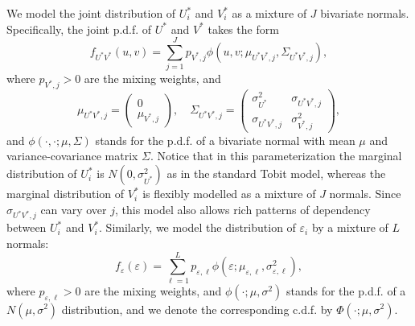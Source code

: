 \documentclass[12pt]{article}
\begin{document}
We model the joint distribution of $U_{i}^{\ast }$ and $V_{i}^{\ast }$ as a
mixture of $J$ bivariate normals. Specifically, the joint p.d.f. of $U^{\ast
}$ and $V^{\ast }$ takes the form %
\begin{equation*}
f_{U^{\ast }V^{\ast }}(u,v)=\sum_{j=1}^{J}p_{V^{\ast },j}\phi (u,v;\mu
_{U^{\ast }V^{\ast },j},\Sigma _{U^{\ast }V^{\ast },j}),
\end{equation*}%
where $p_{V^{\ast },j}>0$ are the mixing weights, and 
\begin{equation*}
\mu _{U^{\ast }V^{\ast },j}=%
\begin{pmatrix}
0 \\ 
\mu _{V^{\ast },j}%
\end{pmatrix}%
,\quad \Sigma _{U^{\ast }V^{\ast },j}=%
\begin{pmatrix}
\sigma _{U^{\ast }}^{2} & \sigma _{U^{\ast }V^{\ast },j} \\ 
\sigma _{U^{\ast }V^{\ast },j} & \sigma _{V^{\ast },j}^{2}%
\end{pmatrix}%
,
\end{equation*}%
and $\phi (\cdot ,\cdot ;\mu ,\Sigma )$ stands for the p.d.f. of a bivariate
normal with mean $\mu $ and variance-covariance matrix $\Sigma $. Notice
that in this parameterization the marginal distribution of $U_{i}^{\ast }$
is $N(0,\sigma _{U^{\ast }}^{2})$ as in the standard Tobit model, whereas
the marginal distribution of $V_{i}^{\ast }$ is flexibly modelled as a
mixture of $J$ normals. Since $\sigma _{U^{\ast }V^{\ast },j}$ can vary over 
$j$, this model also allows rich patterns of dependency between $U_{i}^{\ast
}$ and $V_{i}^{\ast }$. Similarly, we model the distribution of $\varepsilon
_{i}$ by a mixture of $L$ normals:%
\begin{equation*}
f_{\varepsilon }(\varepsilon )=\sum_{\ell =1}^{L}p_{\varepsilon ,\ell }\phi
(\varepsilon ;\mu _{\varepsilon ,\ell },\sigma _{\varepsilon ,\ell }^{2}),
\end{equation*}%
where $p_{\varepsilon ,\ell }>0$ are the mixing weights, and $\phi (\cdot
;\mu ,\sigma ^{2})$ stands for the p.d.f. of a $N\left( \mu ,\sigma
^{2}\right) $ distribution, and we denote the corresponding c.d.f. by $\Phi
(\cdot ;\mu ,\sigma ^{2})$.
\end{document}
